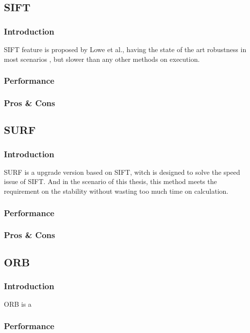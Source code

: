 	\subsection{SIFT}
		\subsubsection{Introduction}
		SIFT feature is proposed by Lowe \cite{lowe2004distinctive} et al., having the state of the art robustness in most scenarios \cite{karami2017image}, but slower than any other methods on execution.
		\subsubsection{Performance}
		\subsubsection{Pros \& Cons}
	
	\subsection{SURF}
		\subsubsection{Introduction}
		SURF is a upgrade version based on SIFT, witch is designed to solve the speed issue of SIFT. 
		And in the scenario of this thesis, this method meets the requirement on the stability without wasting too much time on calculation.
		\subsubsection{Performance}
		\subsubsection{Pros \& Cons}

	\subsection{ORB}
		\subsubsection{Introduction}
		ORB is a
		\subsubsection{Performance}
